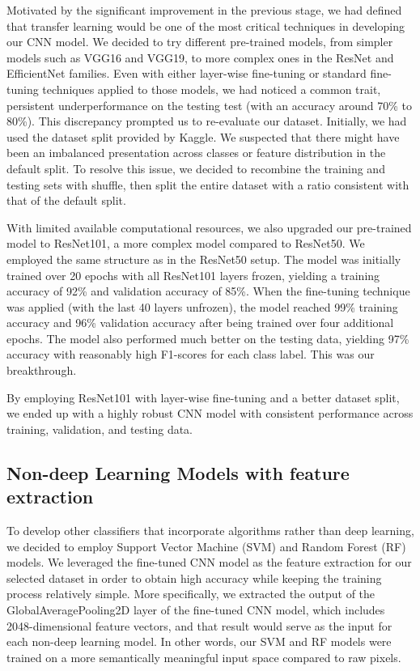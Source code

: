 \documentclass[conference]{IEEEtran}
\begin{document}
Motivated by the significant improvement in the previous stage, we had defined that transfer learning would be one of the most critical techniques in developing our CNN model. We decided to try different pre-trained models, from simpler models such as VGG16 and VGG19, to more complex ones in the ResNet and EfficientNet families. Even with either layer-wise fine-tuning or standard fine-tuning techniques applied to those models, we had noticed a common trait, persistent underperformance on the testing test (with an accuracy around 70\% to 80\%). This discrepancy prompted us to re-evaluate our dataset. Initially, we had used the dataset split provided by Kaggle. We suspected that there might have been an imbalanced presentation across classes or feature distribution in the default split. To resolve this issue, we decided to recombine the training and testing sets with shuffle, then split the entire dataset with a ratio consistent with that of the default split.  

With limited available computational resources, we also upgraded our pre-trained model to ResNet101, a more complex model compared to ResNet50. We employed the same structure as in the ResNet50 setup. The model was initially trained over 20 epochs with all ResNet101 layers frozen, yielding a training accuracy of 92\% and validation accuracy of 85\%. When the fine-tuning technique was applied (with the last 40 layers unfrozen), the model reached 99\% training accuracy and 96\% validation accuracy after being trained over four additional epochs. The model also performed much better on the testing data, yielding 97\% accuracy with reasonably high F1-scores for each class label. This was our breakthrough.

By employing ResNet101 with layer-wise fine-tuning and a better dataset split, we ended up with a highly robust CNN model with consistent performance across training, validation, and testing data.

\subsection{\large Non-deep Learning Models with feature extraction}

To develop other classifiers that incorporate algorithms rather than deep learning, we decided to employ Support Vector Machine (SVM) and Random Forest (RF) models. We leveraged the fine-tuned CNN model as the feature extraction for our selected dataset in order to obtain high accuracy while keeping the training process relatively simple. More specifically, we extracted the output of the GlobalAveragePooling2D layer of the fine-tuned CNN model, which includes 2048-dimensional feature vectors, and that result would serve as the input for each non-deep learning model. In other words, our SVM and RF models were trained on a more semantically meaningful input space compared to raw pixels. 
\end{document}
